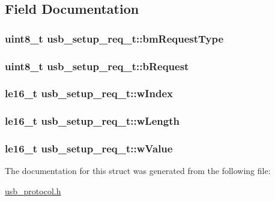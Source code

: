 \subsection{\-Field \-Documentation}
\hypertarget{structusb__setup__req__t_a4d0bc5061aba087bd50d83c5a120b833}{
\subsubsection[{bm\-Request\-Type}]{\setlength{\rightskip}{0pt plus 5cm}uint8\-\_\-t {\bf usb\-\_\-setup\-\_\-req\-\_\-t\-::bm\-Request\-Type}}}
\label{structusb__setup__req__t_a4d0bc5061aba087bd50d83c5a120b833}
\hypertarget{structusb__setup__req__t_ac88656bbea11e32e0be42cd178eba600}{
\subsubsection[{b\-Request}]{\setlength{\rightskip}{0pt plus 5cm}uint8\-\_\-t {\bf usb\-\_\-setup\-\_\-req\-\_\-t\-::b\-Request}}}
\label{structusb__setup__req__t_ac88656bbea11e32e0be42cd178eba600}
\hypertarget{structusb__setup__req__t_ae6ca45a24d06a2ccef7a06b71d1b1699}{
\subsubsection[{w\-Index}]{\setlength{\rightskip}{0pt plus 5cm}le16\-\_\-t {\bf usb\-\_\-setup\-\_\-req\-\_\-t\-::w\-Index}}}
\label{structusb__setup__req__t_ae6ca45a24d06a2ccef7a06b71d1b1699}
\hypertarget{structusb__setup__req__t_a2e8a9bbc9ed2e64335345338a5b4ce1e}{
\subsubsection[{w\-Length}]{\setlength{\rightskip}{0pt plus 5cm}le16\-\_\-t {\bf usb\-\_\-setup\-\_\-req\-\_\-t\-::w\-Length}}}
\label{structusb__setup__req__t_a2e8a9bbc9ed2e64335345338a5b4ce1e}
\hypertarget{structusb__setup__req__t_ab5516d82c87a1334e7ca6fa3bb418faa}{
\subsubsection[{w\-Value}]{\setlength{\rightskip}{0pt plus 5cm}le16\-\_\-t {\bf usb\-\_\-setup\-\_\-req\-\_\-t\-::w\-Value}}}
\label{structusb__setup__req__t_ab5516d82c87a1334e7ca6fa3bb418faa}


\-The documentation for this struct was generated from the following file\-:\begin{DoxyCompactItemize}
\item 
\hyperlink{usb__protocol_8h}{usb\-\_\-protocol.\-h}\end{DoxyCompactItemize}

